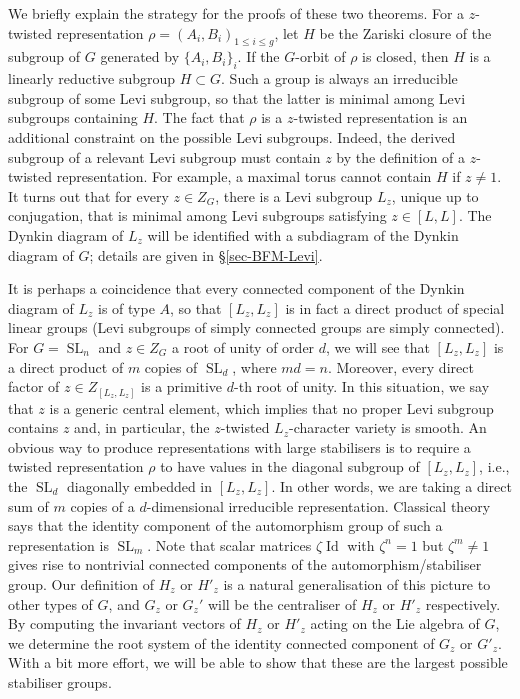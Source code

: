 \documentclass[11pt,oneside,dvipsnames]{amsart}
\theoremstyle{plain}
\theoremstyle{definition}
\theoremstyle{named}
\DeclareMathOperator{\Id}{Id}
\DeclareMathOperator{\SL}{SL}
\begin{document}
We briefly explain the strategy for the proofs of these two theorems. For a $z$-twisted representation $\rho=(A_i,B_i)_{1\le i\le g}$, let $H$ be the Zariski closure of the subgroup of $G$ generated by $\{A_i,B_i\}_i$. If the $G$-orbit of $\rho$ is closed, then $H$ is a linearly reductive subgroup $H\subset G$. Such a group is always an irreducible subgroup of some Levi subgroup, so that the latter is minimal among Levi subgroups containing $H$. The fact that $\rho$ is a $z$-twisted representation is an additional constraint on the possible Levi subgroups. Indeed, the derived subgroup of a relevant Levi subgroup must contain $z$ by the definition of a $z$-twisted representation. For example, a maximal torus cannot contain $H$ if $z\ne 1$. It turns out that for every $z\in Z_G$, there is a Levi subgroup $L_z$, unique up to conjugation, that is minimal among Levi subgroups satisfying $z\in[L,L]$. The Dynkin diagram of $L_z$ will be identified with a subdiagram of the Dynkin diagram of $G$; details are given in \S \ref{sec-BFM-Levi}.

It is perhaps a coincidence that every connected component of the Dynkin diagram of $L_z$ is of type $A$, so that $[L_z,L_z]$ is in fact a direct product of special linear groups (Levi subgroups of simply connected groups are simply connected). For $G=\SL_n$ and $z\in Z_G$ a root of unity of order $d$, we will see that $[L_z,L_z]$ is a direct product of $m$ copies of $\SL_d$, where $md=n$. Moreover, every direct factor of $z\in Z_{[L_z,L_z]}$ is a primitive $d$-th root of unity. In this situation, we say that $z$ is a generic central element, which implies that no proper Levi subgroup contains $z$ and, in particular, the $z$-twisted $L_z$-character variety is smooth. An obvious way to produce representations with large stabilisers is to require a twisted representation $\rho$ to have values in the diagonal subgroup of $[L_z,L_z]$, i.e., the $\SL_d$ diagonally embedded in $[L_z,L_z]$. In other words, we are taking a direct sum of $m$ copies of a $d$-dimensional irreducible representation. Classical theory says that the identity component of the automorphism group of such a representation is $\SL_m$. Note that scalar matrices $\zeta\Id$ with $\zeta^n=1$ but $\zeta^m\ne1$ gives rise to nontrivial connected components of the automorphism/stabiliser group. Our definition of $H_z$ or $H'_z$ is a natural generalisation of this picture to other types of $G$, and $G_z$ or $G_z'$ will be the centraliser of $H_z$ or $H'_z$ respectively. By computing the invariant vectors of $H_z$ or $H'_z$ acting on the Lie algebra of $G$, we determine the root system of the identity connected component of $G_z$ or $G'_z$. With a bit more effort, we will be able to show that these are the largest possible stabiliser groups.
\end{document}
